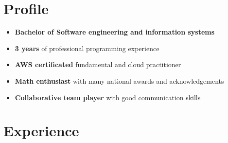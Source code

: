\documentclass[letterpaper]{twentysecondcv} %
\begin{document}
\makesidebarFirst %

\section{Profile}

\begin{itemize}
	\item \textbf{Bachelor of Software engineering and information systems }
	\item \textbf{3 years} of professional programming experience
    \item \textbf{AWS certificated} fundamental and cloud practitioner 
	\item \textbf{Math enthusiast} with many national awards and acknowledgements
    \item \textbf{Collaborative team player} with good communication skills
\end{itemize}

\vspace{6mm}


\section{Experience}
\end{document}
